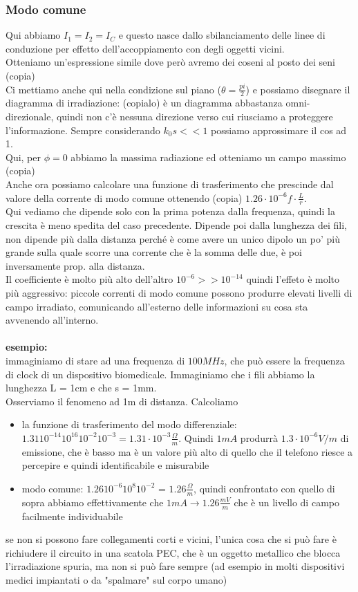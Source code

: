 \documentclass[oneside, 12pt]{extbook}
\begin{document}
{\subsubsection{Modo comune}
Qui abbiamo $I_1 = I_2 = I_C$ e questo nasce dallo sbilanciamento delle linee di conduzione per effetto dell'accoppiamento con degli oggetti vicini.\\Otteniamo un'espressione simile dove però avremo dei coseni al posto dei seni (copia)\\Ci mettiamo anche qui nella condizione sul piano ($\theta = \frac{pi}{2}$) e possiamo disegnare il diagramma di irradiazione: (copialo) è un diagramma abbastanza omni-direzionale, quindi non c'è nessuna direzione verso cui riusciamo a proteggere l'informazione. Sempre considerando $k_0 s << 1$ possiamo approssimare il cos ad 1.\\ Qui, per $\phi = 0$ abbiamo la massima radiazione ed otteniamo un campo massimo (copia)\\Anche ora possiamo calcolare una funzione di trasferimento che prescinde dal valore della corrente di modo comune ottenendo (copia) $1.26 \cdot 10^{-6} f \cdot \frac{L}{r}$.\\Qui vediamo che dipende solo con la prima potenza dalla frequenza, quindi la crescita è meno spedita del caso precedente. Dipende poi dalla lunghezza dei fili, non dipende più dalla distanza perché è come avere un unico dipolo un po' più grande sulla quale scorre una corrente che è la somma delle due, è poi inversamente prop. alla distanza.\\Il coefficiente è molto più alto dell'altro $10^{-6} >> 10^{-14}$ quindi l'effeto è molto più aggressivo: piccole correnti di modo comune possono produrre elevati livelli di campo irradiato, comunicando all'esterno delle informazioni su cosa sta avvenendo all'interno.\\\\ \textbf{esempio:}\\immaginiamo di stare ad una frequenza di $100 MHz$, che può essere la frequenza di clock di un dispositivo biomedicale. Immaginiamo che i fili abbiamo la lunghezza L = 1cm e che s = 1mm.\\Osserviamo il fenomeno ad 1m di distanza. Calcoliamo 
\begin{itemize}
	\item la funzione di trasferimento del modo differenziale: $1.31 10^{-14} 10^{16}10^{-2}10^{-3} = 1.31 \cdot 10^{-3} \frac{\Omega}{m}$. Quindi $1mA$ produrrà $1.3 \cdot 10^{-6} V/m$ di emissione, che è basso ma è un valore più alto di quello che il telefono riesce a percepire e quindi identificabile e misurabile
	\item modo comune: $1.26 10^{-6} 10^{8} 10^{-2}$ = $1.26 \frac{\Omega}{m}$, quindi confrontato con quello di sopra abbiamo effettivamente che $1mA \rightarrow 1.26 \frac{mV}{m}$ che è un livello di campo facilmente individuabile
\end{itemize}
se non si possono fare collegamenti corti e vicini, l'unica cosa che si può fare è richiudere il circuito in una scatola PEC, che è un oggetto metallico che blocca l'irradiazione spuria, ma non si può fare sempre (ad esempio in molti dispositivi medici impiantati o da "spalmare" sul corpo umano)
}
\end{document}
